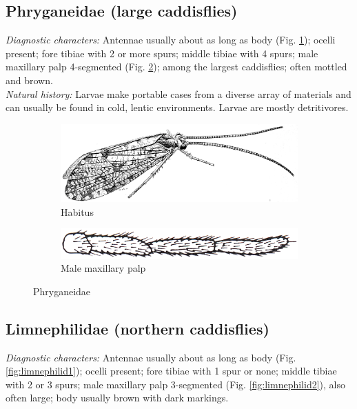 \documentclass[letterpaper, 11pt]{article}
\begin{document}
\subsection{Phryganeidae (large caddisflies)}
\noindent{}\textit{Diagnostic characters:} Antennae usually about as long as body (Fig. \ref{fig:phrygan1}); ocelli present; fore tibiae with 2 or more spurs; middle tibiae with 4 spurs; male maxillary palp 4-segmented (Fig. \ref{fig:phrygan2}); among the largest caddisflies; often mottled and brown.\\

\noindent{}\textit{Natural history:} Larvae make portable cases from a diverse array of materials and can usually be found in cold, lentic environments. Larvae are mostly detritivores.

\begin{figure}[ht!]
    \centering
    \begin{subfigure}[ht!]{0.68\textwidth}
        \includegraphics[width=\textwidth]{PhryganeidHabitus}
        \caption{Habitus \citep[][Fig. 591]{bhl50956}}
        \label{fig:phrygan1}
    \end{subfigure}
    \hfill %
    \begin{subfigure}[ht!]{0.25\textwidth}
        \includegraphics[width=\textwidth]{TrichoImage01}
        \caption{Male maxillary palp \citep[][Fig. 64]{bhl50956}}
        \label{fig:phrygan2}
    \end{subfigure}
    \caption{Phryganeidae}\label{fig:phrygan}
\end{figure}

\subsection{Limnephilidae (northern caddisflies)}
\noindent{}\textit{Diagnostic characters:} Antennae usually about as long as body (Fig. \ref{fig:limnephilid1}); ocelli present; fore tibiae with 1 spur or none; middle tibiae with 2 or 3 spurs; male maxillary palp 3-segmented (Fig. \ref{fig:limnephilid2}), also often large; body usually brown with dark markings.\\ 
\end{document}
